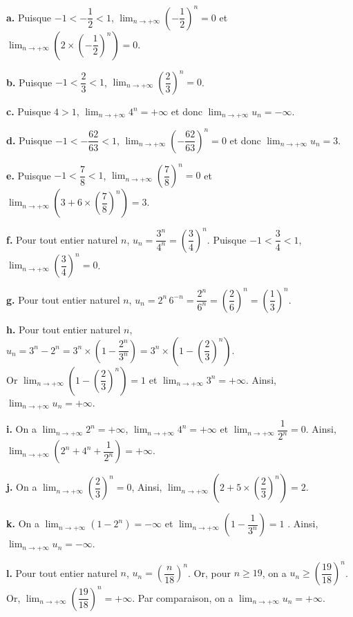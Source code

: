 \documentclass[11pt,fleqn, openany]{book} %
\begin{document}
\begin{solution}\textbf{a.} Puisque $-1< -\dfrac{1}{2}<1$, $\displaystyle \lim_{n \to +\infty} \left(- \dfrac{1}{2}\right)^n = 0$ et $\displaystyle \lim_{n \to +\infty} \left(2 \times \left(-\dfrac{1}{2}\right)^n\right)=0$.

\textbf{b.} Puisque $-1< \dfrac{2}{3}<1$, $\displaystyle \lim_{n \to +\infty} \left( \dfrac{2}{3}\right)^n = 0$.

\textbf{c.} Puisque $4>1$, $\displaystyle \lim_{n\to + \infty} 4^n=+\infty$ et donc $\displaystyle \lim_{n\to + \infty} u_n = -\infty$.

\textbf{d.} Puisque $-1< -\dfrac{62}{63}<1$, $\displaystyle \lim_{n\to + \infty} \left(-\dfrac{62}{63}\right)^n=0$ et donc $\displaystyle \lim_{n\to + \infty} u_n = 3$.

\textbf{e.} Puisque $-1<\dfrac{7}{8}<1$, $\displaystyle \lim_{n \to +\infty} \left(\dfrac{7}{8}\right)^n=0$ et $\displaystyle \lim_{n \to +\infty} \left(3+6\times \left(\dfrac{7}{8}\right)^n\right)=3$.

\textbf{f.} Pour tout entier naturel $n$, $u_n = \dfrac{3^n}{4^n}=\left(\dfrac{3}{4}\right)^n$. Puisque $-1< \dfrac{3}{4}<1$, $\displaystyle \lim_{n \to +\infty} \left( \dfrac{3}{4}\right)^n = 0$.

\textbf{g.} Pour tout entier naturel $n$, $u_n = 2^n\,6^{-n} = \dfrac{2^n}{6^n}= \left(\dfrac{2}{6}\right)^n=\left(\dfrac{1}{3}\right)^n$.

\textbf{h.} Pour tout entier naturel $n$, $u_n=3^n-2^n=3^n \times \left(1-\dfrac{2^n}{3^n}\right)=3^n \times \left(1-\left(\dfrac{2}{3}\right)^n\right)$.\\ Or $\displaystyle \lim_{n \to +\infty}\left(1-\left(\dfrac{2}{3}\right)^n\right)=1$ et $\displaystyle \lim_{n \to +\infty} 3^n = +\infty$. Ainsi, $\displaystyle \lim_{n \to +\infty} u_n = +\infty $.

\textbf{i.} On a $\displaystyle \lim_{n \to +\infty} 2^n=+\infty$, $\displaystyle \lim_{n \to +\infty} 4^n=+\infty$ et $\displaystyle \lim_{n \to +\infty} \dfrac{1}{2^n}=0$. Ainsi, $\displaystyle \lim_{n \to +\infty} \left(2^n+4^n+\dfrac{1}{2^n}\right)=+\infty$.

\textbf{j.} On a $\displaystyle \lim_{n \to +\infty} \left(\dfrac{2}{3}\right)^n=0$, Ainsi, $\displaystyle \lim_{n \to +\infty} \left(2+5\times \left(\dfrac{2}{3}\right)^n\right)=2$.

\textbf{k.}  On a $\displaystyle \lim_{n \to +\infty}(1-2^{n})=-\infty$ et $\displaystyle \lim_{n \to +\infty}\left(1-\dfrac{1}{3^n}\right)=1$ . Ainsi, $\displaystyle \lim_{n \to +\infty}u_n=-\infty$.
 
\textbf{l.} Pour tout entier naturel $n$, $u_n = \left(\dfrac{n}{18}\right)^n$. Or, pour $n\geqslant 19$, on a $u_n \geqslant \left(\dfrac{19}{18}\right)^n$. Or, $\displaystyle \lim_{n\to+\infty}\left(\dfrac{19}{18}\right)^n=+\infty$. Par comparaison, on a $\displaystyle \lim_{n\to+\infty}u_n=+\infty$.
\newpage \end{solution}
\end{document}
